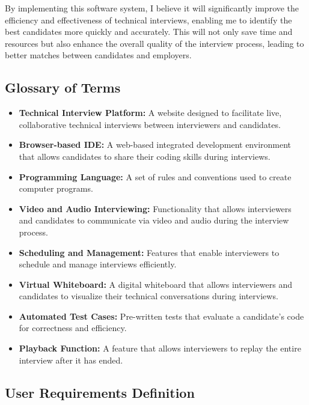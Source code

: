 \documentclass{article}
\begin{document}
By implementing this software system, I believe it will significantly improve the efficiency and effectiveness of technical interviews, enabling me to identify the best candidates more quickly and accurately. This will not only save time and resources but also enhance the overall quality of the interview process, leading to better matches between candidates and employers.

\subsection{Glossary of Terms}

\begin{itemize}
  \item \textbf{Technical Interview Platform:} A website designed to facilitate live, collaborative technical interviews between interviewers and candidates. 
  \item \textbf{Browser-based IDE:} A web-based integrated development environment that allows candidates to share their coding skills during interviews. 
  \item \textbf{Programming Language:} A set of rules and conventions used to create computer programs. 
  \item \textbf{Video and Audio Interviewing:} Functionality that allows interviewers and candidates to communicate via video and audio during the interview process. 
  \item \textbf{Scheduling and Management:} Features that enable interviewers to schedule and manage interviews efficiently. 
  \item \textbf{Virtual Whiteboard:} A digital whiteboard that allows interviewers and candidates to visualize their technical conversations during interviews. 
  \item \textbf{Automated Test Cases:} Pre-written tests that evaluate a candidate’s code for correctness and efficiency. 
  \item \textbf{Playback Function:} A feature that allows interviewers to replay the entire interview after it has ended. 
\end{itemize}


\subsection{User Requirements Definition}
\end{document}
